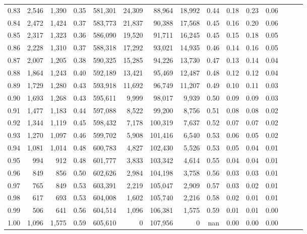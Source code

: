 \begin{tabular}{rrrrrrrrrrrrrrr}
0.83 &   2,546 &  1,390 &  0.35 &  581,301 &   24,309 &   88,964 &   18,992 &  0.44 &  0.18 &  0.23 &      0.06 \\
0.84 &   2,472 &  1,424 &  0.37 &  583,773 &   21,837 &   90,388 &   17,568 &  0.45 &  0.16 &  0.20 &      0.06 \\
0.85 &   2,317 &  1,323 &  0.36 &  586,090 &   19,520 &   91,711 &   16,245 &  0.45 &  0.15 &  0.18 &      0.05 \\
0.86 &   2,228 &  1,310 &  0.37 &  588,318 &   17,292 &   93,021 &   14,935 &  0.46 &  0.14 &  0.16 &      0.05 \\
0.87 &   2,007 &  1,205 &  0.38 &  590,325 &   15,285 &   94,226 &   13,730 &  0.47 &  0.13 &  0.14 &      0.04 \\
0.88 &   1,864 &  1,243 &  0.40 &  592,189 &   13,421 &   95,469 &   12,487 &  0.48 &  0.12 &  0.12 &      0.04 \\
0.89 &   1,729 &  1,280 &  0.43 &  593,918 &   11,692 &   96,749 &   11,207 &  0.49 &  0.10 &  0.11 &      0.03 \\
0.90 &   1,693 &  1,268 &  0.43 &  595,611 &    9,999 &   98,017 &    9,939 &  0.50 &  0.09 &  0.09 &      0.03 \\
0.91 &   1,477 &  1,183 &  0.44 &  597,088 &    8,522 &   99,200 &    8,756 &  0.51 &  0.08 &  0.08 &      0.02 \\
0.92 &   1,344 &  1,119 &  0.45 &  598,432 &    7,178 &  100,319 &    7,637 &  0.52 &  0.07 &  0.07 &      0.02 \\
0.93 &   1,270 &  1,097 &  0.46 &  599,702 &    5,908 &  101,416 &    6,540 &  0.53 &  0.06 &  0.05 &      0.02 \\
0.94 &   1,081 &  1,014 &  0.48 &  600,783 &    4,827 &  102,430 &    5,526 &  0.53 &  0.05 &  0.04 &      0.01 \\
0.95 &     994 &    912 &  0.48 &  601,777 &    3,833 &  103,342 &    4,614 &  0.55 &  0.04 &  0.04 &      0.01 \\
0.96 &     849 &    856 &  0.50 &  602,626 &    2,984 &  104,198 &    3,758 &  0.56 &  0.03 &  0.03 &      0.01 \\
0.97 &     765 &    849 &  0.53 &  603,391 &    2,219 &  105,047 &    2,909 &  0.57 &  0.03 &  0.02 &      0.01 \\
0.98 &     617 &    693 &  0.53 &  604,008 &    1,602 &  105,740 &    2,216 &  0.58 &  0.02 &  0.01 &      0.01 \\
0.99 &     506 &    641 &  0.56 &  604,514 &    1,096 &  106,381 &    1,575 &  0.59 &  0.01 &  0.01 &      0.00 \\
1.00 &   1,096 &  1,575 &  0.59 &  605,610 &        0 &  107,956 &        0 &   nan &  0.00 &  0.00 &      0.00 \\
\bottomrule
\end{tabular}
